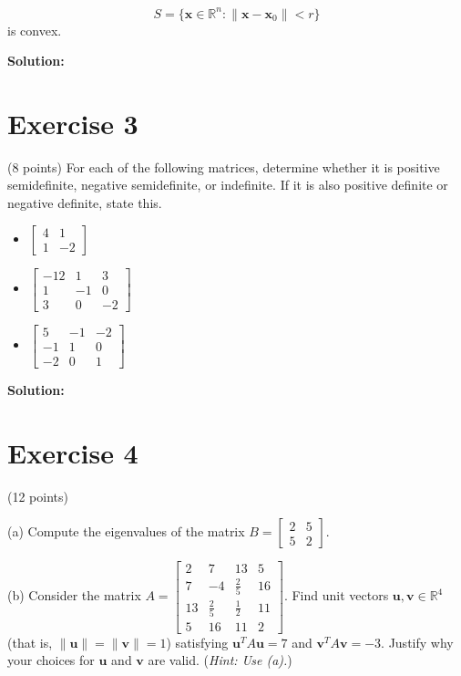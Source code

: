 \documentclass{article}
\begin{document}
$$S = \{\mathbf{x} \in \mathbb{R}^n : \|\mathbf{x} - \mathbf{x}_0\| < r\}$$
is convex.

\textbf{Solution: } \\



\newpage

\section*{Exercise 3}
(8 points) For each of the following matrices, determine whether it is positive semidefinite, negative semidefinite, or indefinite. If it is also positive definite or negative definite, state this.
\begin{itemize}
\item $\begin{bmatrix} 4 & 1 \\ 1 & -2 \end{bmatrix}$

\item $\begin{bmatrix} -12 & 1 & 3 \\ 1 & -1 & 0 \\ 3 & 0 & -2 \end{bmatrix}$

\item $\begin{bmatrix} 5 & -1 & -2 \\ -1 & 1 & 0 \\ -2 & 0 & 1 \end{bmatrix}$
\end{itemize}

\textbf{Solution: } \\



\newpage

\section*{Exercise 4}
(12 points)

(a) Compute the eigenvalues of the matrix $B = \begin{bmatrix} 2 & 5 \\ 5 & 2 \end{bmatrix}$.

(b) Consider the matrix $A = \begin{bmatrix} 2 & 7 & 13 & 5 \\ 7 & -4 & \frac{2}{5} & 16 \\ 13 & \frac{2}{5} & \frac{1}{2} & 11 \\ 5 & 16 & 11 & 2 \end{bmatrix}$. Find unit vectors $\mathbf{u}, \mathbf{v} \in \mathbb{R}^4$ (that is, $\|\mathbf{u}\| = \|\mathbf{v}\| = 1$) satisfying $\mathbf{u}^T A\mathbf{u} = 7$ and $\mathbf{v}^T A\mathbf{v} = -3$. Justify why your choices for $\mathbf{u}$ and $\mathbf{v}$ are valid.
(\textit{Hint: Use (a).}) \\
\end{document}

